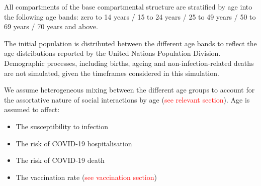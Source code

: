 All compartments of the base compartmental structure are stratified by age into the following age bands:
zero to 14 years / 15 to 24 years / 25 to 49 years / 50 to 69 years / 70 years and above.

The initial population is distributed between the different age bands to reflect the age distributions reported by the United Nations Population Division. Demographic processes, including births, ageing and non-infection-related deaths are not simulated, given the timeframes considered in this simulation.

We assume heterogeneous mixing between the different age groups to account for the assortative nature of social interactions by age (\textcolor{red}{see relevant section}).
Age is assumed to affect:
\begin{itemize}
    \item The susceptibility to infection
    \item The risk of COVID-19 hospitalisation
    \item The risk of COVID-19 death
    \item The vaccination rate (\textcolor{red}{see vaccination section})
\end{itemize}
